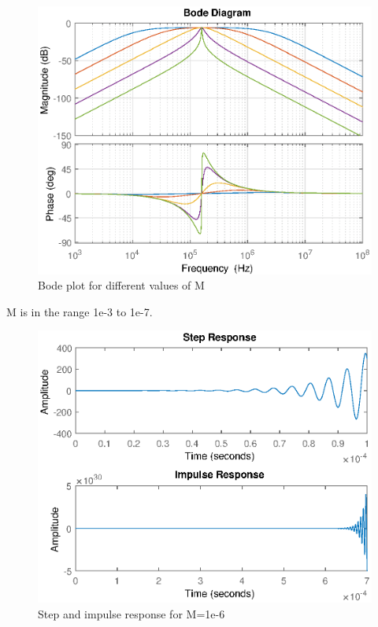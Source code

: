 \begin{figure}
    \centering
    \includegraphics[width=\textwidth]{img/CoilRigBode_M.eps}
    \caption{Bode plot for different values of M}
    \label{fig:my_label}
\end{figure}
M is in the range 1e-3 to 1e-7.

\begin{figure}
    \centering
    \includegraphics[width=\textwidth]{img/CoilRigResponse.eps}
    \caption{Step and impulse response for M=1e-6}
    \label{fig:my_label}
\end{figure}

